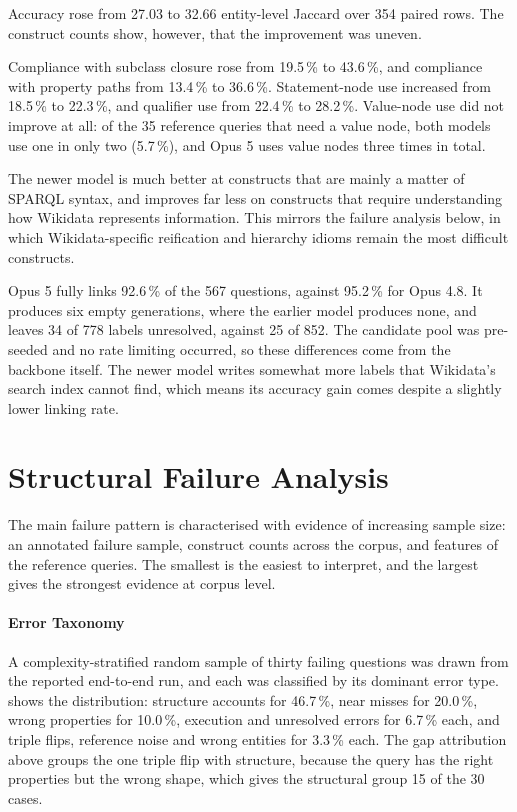 Accuracy rose from 27.03 to 32.66 entity-level Jaccard over 354 paired rows.
The construct counts show, however, that the improvement was uneven.

Compliance with subclass closure rose from 19.5\,\% to 43.6\,\%, and compliance with property paths from 13.4\,\% to 36.6\,\%.
Statement-node use increased from 18.5\,\% to 22.3\,\%, and qualifier use from 22.4\,\% to 28.2\,\%.
Value-node use did not improve at all: of the 35 reference queries that need a value node, both models use one in only two (5.7\,\%), and Opus 5 uses value nodes three times in total.

The newer model is much better at constructs that are mainly a matter of SPARQL syntax, and improves far less on constructs that require understanding how Wikidata represents information.
This mirrors the failure analysis below, in which Wikidata-specific reification and hierarchy idioms remain the most difficult constructs.

Opus 5 fully links 92.6\,\% of the 567 questions, against 95.2\,\% for Opus 4.8.
It produces six empty generations, where the earlier model produces none, and leaves 34 of 778 labels unresolved, against 25 of 852.
The candidate pool was pre-seeded and no rate limiting occurred, so these differences come from the backbone itself.
The newer model writes somewhat more labels that Wikidata's search index cannot find, which means its accuracy gain comes despite a slightly lower linking rate.

\section{Structural Failure
Analysis}

\label{sec:error-analysis}

The main failure pattern is characterised with evidence of increasing sample size: an annotated failure sample, construct counts across the corpus, and features of the reference queries.
The smallest is the easiest to interpret, and the largest gives the strongest evidence at corpus level.

\paragraph{Error Taxonomy}



A complexity-stratified random sample of thirty failing questions was drawn from the reported end-to-end run, and each was classified by its dominant error type.
 shows the distribution: structure accounts for 46.7\,\%, near misses for 20.0\,\%, wrong properties for 10.0\,\%, execution and unresolved errors for 6.7\,\% each, and triple flips, reference noise and wrong entities for 3.3\,\% each.
The gap attribution above groups the one triple flip with structure, because the query has the right properties but the wrong shape, which gives the structural group 15 of the 30 cases.

